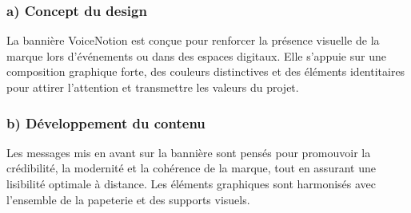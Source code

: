 \subsubsection*{a) Concept du design}
La bannière VoiceNotion est conçue pour renforcer la présence visuelle de la marque lors d’événements ou dans des espaces digitaux. Elle s’appuie sur une composition graphique forte, des couleurs distinctives et des éléments identitaires pour attirer l’attention et transmettre les valeurs du projet.

\subsubsection*{b) Développement du contenu}
Les messages mis en avant sur la bannière sont pensés pour promouvoir la crédibilité, la modernité et la cohérence de la marque, tout en assurant une lisibilité optimale à distance. Les éléments graphiques sont harmonisés avec l’ensemble de la papeterie et des supports visuels.

